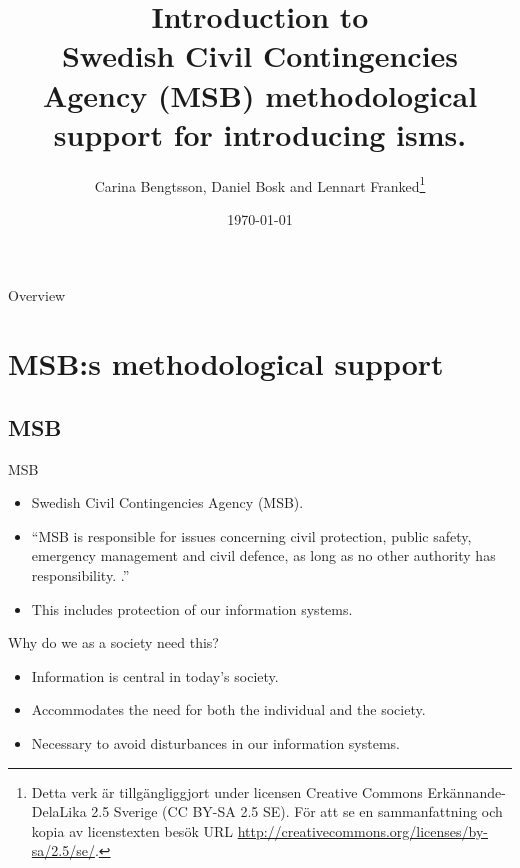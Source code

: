 \documentclass{beamer}
\title[Intro MSB]{%
  Introduction to\\
  Swedish Civil Contingencies Agency (MSB) methodological support for introducing \ac{isms}.
}
\author{Carina Bengtsson, Daniel Bosk and Lennart Franked\footnote{%
  Detta verk är tillgängliggjort under licensen Creative Commons 
  Erkännande-DelaLika 2.5 Sverige (CC BY-SA 2.5 SE).
	För att se en sammanfattning och kopia av licenstexten besök URL 
	\url{http://creativecommons.org/licenses/by-sa/2.5/se/}.
}}
\institute[MIUN IST]{%
  Department of Informationsystem and Technologies (IST),\\
  Mid Sweden University, Sundsvall.
	
}
\date{\today}
\begin{document}
\begin{frame}
  \titlepage{}
\end{frame}

\begin{frame}{Overview}
	\tableofcontents
\end{frame}





\section[Methodilogical support]{MSB:s methodological support}

\subsection{MSB}

\begin{frame}{MSB}
  \begin{itemize}
    \item Swedish Civil Contingencies Agency (MSB).
    \item \enquote{MSB is responsible for issues concerning civil protection,
        public safety, emergency management and civil defence, as long as no
        other authority has responsibility\cite[About MSB]{msbse}\@.
        .}
    \item This includes protection of our information systems.
  \end{itemize}
\end{frame}


\begin{frame}{Why do we as a society need this?}
  \begin{itemize}
    \item Information is central in today's society.
    \item Accommodates the need for both the individual and the society.
    \item Necessary to avoid disturbances in our information systems.
  \end{itemize}
\end{frame}
\end{document}

